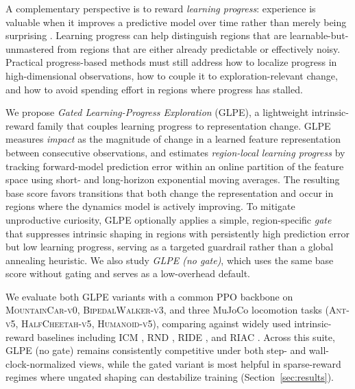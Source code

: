 A complementary perspective is to reward \emph{learning progress}: experience is valuable when it improves a predictive model over time rather than merely being surprising \cite{schmidhuber-1991,oudeyer-2007A,baranes-2009}.
Learning progress can help distinguish regions that are learnable-but-unmastered from regions that are either already predictable or effectively noisy.
Practical progress-based methods must still address how to localize progress in high-dimensional observations, how to couple it to exploration-relevant change, and how to avoid spending effort in regions where progress has stalled.

We propose \emph{Gated Learning-Progress Exploration} (GLPE), a lightweight intrinsic-reward family that couples learning progress to representation change.
GLPE measures \emph{impact} as the magnitude of change in a learned feature representation between consecutive observations, and estimates \emph{region-local learning progress} by tracking forward-model prediction error within an online partition of the feature space using short- and long-horizon exponential moving averages.
The resulting base score favors transitions that both change the representation and occur in regions where the dynamics model is actively improving.
To mitigate unproductive curiosity, GLPE optionally applies a simple, region-specific \emph{gate} that suppresses intrinsic shaping in regions with persistently high prediction error but low learning progress, serving as a targeted guardrail rather than a global annealing heuristic.
We also study \emph{GLPE (no gate)}, which uses the same base score without gating and serves as a low-overhead default.

We evaluate both GLPE variants with a common PPO backbone on \textsc{MountainCar-v0}, \textsc{BipedalWalker-v3}, and three MuJoCo locomotion tasks (\textsc{Ant-v5}, \textsc{HalfCheetah-v5}, \textsc{Humanoid-v5}), comparing against widely used intrinsic-reward baselines including ICM \cite{pathak-2017}, RND \cite{burda-2018B}, RIDE \cite{raileanu-2020}, and RIAC \cite{baranes-2009}.
Across this suite, GLPE (no gate) remains consistently competitive under both step- and wall-clock-normalized views, while the gated variant is most helpful in sparse-reward regimes where ungated shaping can destabilize training (Section~\ref{sec:results}).
